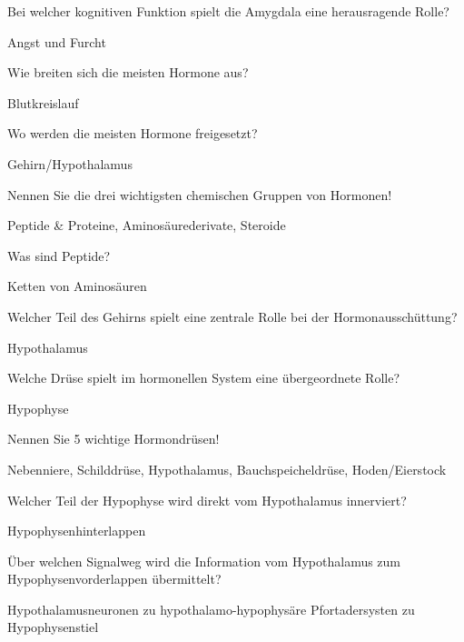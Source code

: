 \documentclass[10pt, a4paper]{exam}
\newcommand\Warning{%
 \makebox[1.4em][c]{%
 \makebox[0pt][c]{\raisebox{.1em}{\small!}}%
 \makebox[0pt][c]{\color{red}\Large$\bigtriangleup$}}}%
\begin{document}
\begin{questions}
  \question Bei welcher kognitiven Funktion spielt die Amygdala eine herausragende Rolle?
  \begin{solution}
    Angst und Furcht
  \end{solution}

  \question Wie breiten sich die meisten Hormone aus?
  \begin{solution}
    Blutkreislauf
  \end{solution}

  \question Wo werden die meisten Hormone freigesetzt?
  \begin{solution}
    Gehirn/Hypothalamus \Warning
  \end{solution}

  \question Nennen Sie die drei wichtigsten chemischen Gruppen von Hormonen!
  \begin{solution}
    Peptide \& Proteine, Aminosäurederivate, Steroide
  \end{solution}

  \question Was sind Peptide?
  \begin{solution}
    Ketten von Aminosäuren
  \end{solution}

  \question Welcher Teil des Gehirns spielt eine zentrale Rolle bei der Hormonausschüttung?
  \begin{solution}
    Hypothalamus
  \end{solution}

  \question Welche Drüse spielt im hormonellen System eine übergeordnete Rolle?
  \begin{solution}
    Hypophyse
  \end{solution}

  \question Nennen Sie 5 wichtige Hormondrüsen!
  \begin{solution}
    Nebenniere, Schilddrüse, Hypothalamus, Bauchspeicheldrüse, Hoden/Eierstock
  \end{solution}

  \question Welcher Teil der Hypophyse wird direkt vom Hypothalamus innerviert?
  \begin{solution}
    Hypophysenhinterlappen
  \end{solution}

  \question Über welchen Signalweg wird die Information vom Hypothalamus zum Hypophysenvorderlappen übermittelt?
  \begin{solution}
    Hypothalamusneuronen zu hypothalamo-hypophysäre Pfortadersysten zu Hypophysenstiel
  \end{solution}


\end{questions}
\end{document}
